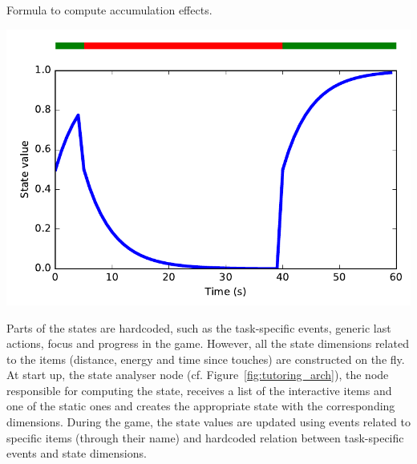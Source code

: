 \begin{minipage}[t]{0.53\textwidth}
\begin{algorithm}[H]
	\caption{Formula to compute accumulation effects.}
	\label{algo:tuto_acc}
\end{algorithm}
\end{minipage}
\begin{minipage}[t]{0.47\textwidth}
		\centering
		\vspace{.1cm}
		\includegraphics[width=1\textwidth]{accumulation.pdf}
		\label{fig:tuto_acc}
\end{minipage}

Parts of the states are hardcoded, such as the task-specific events, generic last actions, focus and progress in the game. However, all the state dimensions related to the items (distance, energy and time since touches) are constructed on the fly. At start up, the state analyser node (cf. Figure~\ref{fig:tutoring_arch}), the node responsible for computing the state, receives a list of the interactive items and one of the static ones and creates the appropriate state with the corresponding dimensions. During the game, the state values are updated using events related to specific items (through their name) and hardcoded relation between task-specific events and state dimensions. 

